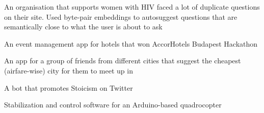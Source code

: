 An organisation that supports women with HIV faced a lot of duplicate questions on their site.
Used byte-pair embeddings to autosuggest questions that are semantically close to what the user is about to ask

\smallskip

An event management app for hotels that won AccorHotels Budapest Hackathon

\smallskip

An app for a group of friends from different cities that suggest the cheapest (airfare-wise) city for them to meet up in

\smallskip

A bot that promotes Stoicism on Twitter

\smallskip


\smallskip

Stabilization and control software for an Arduino-based quadrocopter

\smallskip


